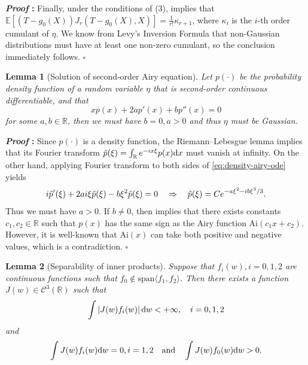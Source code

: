 \documentclass{article}
\def\gC{{\mathcal{C}}}
\newcommand{\E}{\mathbb{E}}
\newcommand{\R}{\mathbb{R}}
\newcommand{\dd}{\textup{d}}
\newtheorem{lemma}{Lemma}[section]
\renewenvironment{proof}{\noindent\textbf{\textit{Proof }:}}{\hfill$\square$}
\begin{document}
\begin{proof}
Finally, under the conditions of (3),  implies that $\E[(T-g_0(X))J_r(T-g_0(X),X)]=\frac{1}{r!}\kappa_{r+1}$, where $\kappa_i$ is the $i$-th order cumulant of $\eta$. We know from Levy's Inversion Formula \cite[Theorem 3.3.11]{durrett2019probability} that non-Gaussian distributions must have at least one non-zero cumulant, so the conclusion immediately follows.
\end{proof}



\begin{lemma}[Solution of second-order Airy equation]
    \label{lemma:airy-solution}
    Let $p(\cdot)$ be the probability density function of a random variable $\eta$ that is second-order continuous differentiable, and that 
    \begin{equation}
    \label{eq:density-airy-ode}
        xp(x)+2a p'(x)+b p''(x)=0
    \end{equation}
    for some $a,b\in\R$, then we must have $b=0, a>0$ and thus $\eta$ must be Gaussian.
\end{lemma}

\begin{proof}
    Since $p(\cdot)$ is a density function, the Riemann–Lebesgue lemma implies that its Fourier transform $\hat{p}(\xi)=\int_{\R}e^{-ix\xi}p(x)\dd x$ must vanish at infinity. On the other hand, applying Fourier transform to both sides of \eqref{eq:density-airy-ode} yields
    \begin{equation}
        \notag
        i\hat{p}'(\xi) + 2ai\xi\hat{p}(\xi) - b\xi^2\hat{p}(\xi) = 0 \quad \Rightarrow \quad \hat{p}(\xi) = C e^{-a\xi^2 - ib\xi^3/3}.
    \end{equation}
    Thus we must have $a>0$. If $b\neq 0$, \cite[ 4.2]{ansari2016gauss} then implies that there exists constants $c_1, c_2 \in \R$ such that $p(x)$ has the same sign as the Airy function $\mathrm{Ai}(c_1x+c_2)$. However, it is well-known that $\mathrm{Ai}(x)$ can take both positive and negative values, which is a contradiction.
\end{proof}

\begin{lemma}[Separability of inner products]
\label{lemma:polynomial-riesz-separation}
    Suppose that $f_i(w), i=0,1,2$ are continuous functions 
    such that $f_0\notin\mathrm{span}\langle f_1,f_2\rangle$. Then there exists a function $J(w)\in\gC^3(\R)$ such that 
    \begin{equation}
        \notag
        \int \left|J(w) f_i(w)\right| \dd w < +\infty,\quad i=0,1,2
    \end{equation}
    and
    \begin{equation}
        \notag
        \int J(w) f_i(w) \dd w = 0, i=1,2 \quad \text{and} \quad \int J(w) f_0(w) \dd w > 0.
    \end{equation}
\end{lemma}
\end{document}
